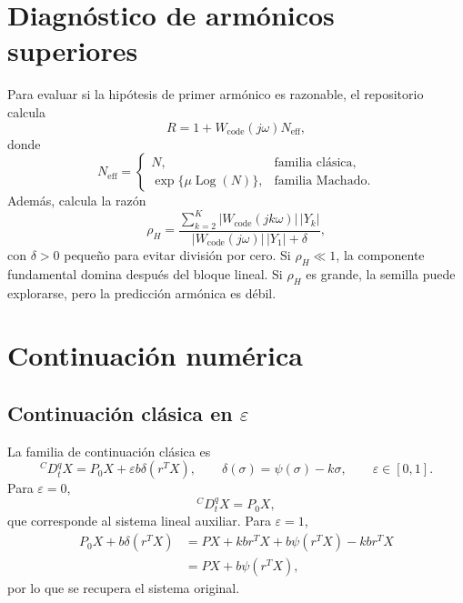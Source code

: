 \documentclass[11pt]{article}
\newcommand{\Log}{\operatorname{Log}}
\newcommand{\eps}{\varepsilon}
\begin{document}
\section{Diagnóstico de armónicos superiores}

Para evaluar si la hipótesis de primer armónico es razonable, el repositorio calcula
\begin{equation}
R=1+W_{\mathrm{code}}(j\omega)N_{\mathrm{eff}},
\label{eq:residual_general}
\end{equation}
donde
\begin{equation}
N_{\mathrm{eff}}=
\begin{cases}
N, & \text{familia clásica},\\
\exp\{\mu\Log(N)\}, & \text{familia Machado}.
\end{cases}
\end{equation}
Además, calcula la razón
\begin{equation}
\rho_H=
\frac{\displaystyle\sum_{k=2}^{K}|W_{\mathrm{code}}(jk\omega)|\,|Y_k|}
{|W_{\mathrm{code}}(j\omega)|\,|Y_1|+\delta},
\label{eq:rhoH}
\end{equation}
con \(\delta>0\) pequeño para evitar división por cero. Si \(\rho_H\ll1\), la componente fundamental domina después del bloque lineal. Si \(\rho_H\) es grande, la semilla puede explorarse, pero la predicción armónica es débil.

\section{Continuación numérica}

\subsection{Continuación clásica en \texorpdfstring{\(\eps\)}{epsilon}}

La familia de continuación clásica es
\begin{equation}
{}^C D_t^q X=P_0X+\eps b\delta(r^TX),
\qquad
\delta(\sigma)=\psi(\sigma)-k\sigma,
\qquad
\eps\in[0,1].
\label{eq:continuation_eps}
\end{equation}
Para \(\eps=0\),
\begin{equation}
{}^C D_t^qX=P_0X,
\end{equation}
que corresponde al sistema lineal auxiliar. Para \(\eps=1\),
\begin{align}
P_0X+b\delta(r^TX)
&=P X+kbr^TX+b\psi(r^TX)-kb r^TX\\
&=PX+b\psi(r^TX),
\end{align}
por lo que se recupera el sistema original.
\end{document}

